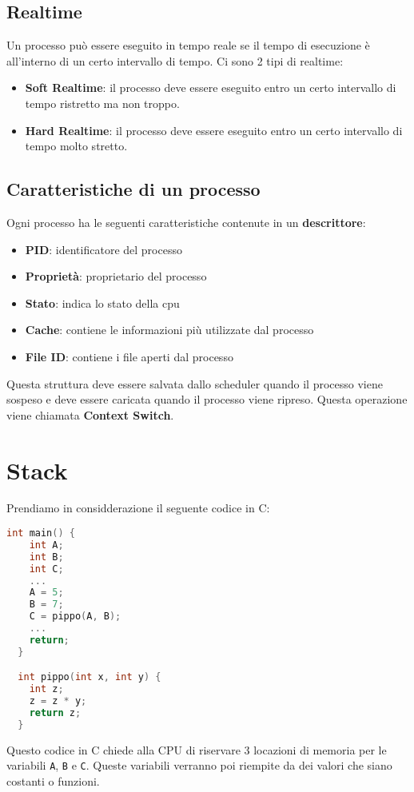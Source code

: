 \documentclass[a4paper]{article}
\theoremstyle{break}
\theoremstyle{break}
\theoremstyle{break}
\theoremstyle{break}
\begin{document}
\subsection{Realtime}
Un processo può essere eseguito in tempo reale se il tempo di esecuzione è all'interno
di un certo intervallo di tempo. Ci sono 2 tipi di realtime:
\begin{itemize}
	\item \textbf{Soft Realtime}: il processo deve essere eseguito entro un certo intervallo
	      di tempo ristretto ma non troppo.
	\item \textbf{Hard Realtime}: il processo deve essere eseguito entro un certo intervallo
	      di tempo molto stretto.
\end{itemize}

\subsection{Caratteristiche di un processo}
Ogni processo ha le seguenti caratteristiche contenute in un \textbf{descrittore}:
\begin{itemize}
	\item \textbf{PID}: identificatore del processo
	\item \textbf{Proprietà}: proprietario del processo
	\item \textbf{Stato}: indica lo stato della cpu
	\item \textbf{Cache}: contiene le informazioni più utilizzate dal processo
	\item \textbf{File ID}: contiene i file aperti dal processo
\end{itemize}

\noindent Questa struttura deve essere salvata dallo scheduler quando il processo viene
sospeso e deve essere caricata quando il processo viene ripreso. Questa operazione
viene chiamata \textbf{Context Switch}.


\section{Stack}
Prendiamo in considderazione il seguente codice in C:
\begin{lstlisting}[language=C]
  int main() {
    int A;
    int B;
    int C;
    ...
    A = 5;
    B = 7;
    C = pippo(A, B);
    ...
    return;
  }

  int pippo(int x, int y) {
    int z;
    z = z * y;
    return z;
  }
\end{lstlisting}
Questo codice in C chiede alla CPU di riservare 3 locazioni di memoria per le variabili
\texttt{A}, \texttt{B} e \texttt{C}. Queste variabili verranno poi riempite da dei valori
che siano costanti o funzioni.
\end{document}

